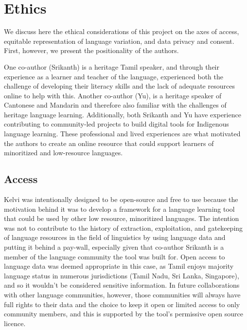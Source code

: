 \documentclass[11pt]{article}
\begin{document}
\section{Ethics}
We discuss here the ethical considerations of this project on the axes of access, 
equitable representation of language variation, and data privacy and consent. First, however, we present the positionality of the authors.

One co-author (Srikanth) is a heritage Tamil speaker, and through their experience as a learner and teacher of the language, experienced both the challenge of developing their literacy skills and the lack of adequate resources online to help with this. Another co-author (Yu), is a heritage speaker of Cantonese and Mandarin and therefore also familiar with the challenges of heritage language learning. Additionally, both Srikanth and Yu have experience contributing to community-led projects to build digital tools for Indigenous language learning. These professional and lived experiences are what motivated the authors to create an online resource that could support learners of minoritized and low-resource languages. 


\subsection{Access}
Kelvi was intentionally designed to be open-source and free to use because the 
motivation behind it was to develop a framework for a language learning tool that 
could be used by other low resource, minoritized languages. The intention was not 
to contribute to the history of extraction, exploitation, and gatekeeping of 
language resources in the field of linguistics \citep{leonard_toward_2021} by 
using language data and putting it behind a pay-wall, especially given that co-author Srikanth is a member of the language community the tool was built for. 
Open access to language data was deemed appropriate in this case, as Tamil enjoys 
majority language status in numerous jurisdictions (Tamil Nadu, Sri Lanka, Singapore), 
and so it wouldn’t be considered sensitive information. In future collaborations with 
other language communities, however, those communities will always have full rights 
to their data and the choice to keep it open or limited access to only community members, 
and this is supported by the tool’s permissive open source licence.
\end{document}

